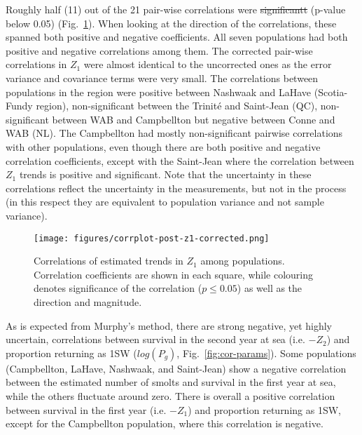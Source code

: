 \documentclass[12pt]{article}
\providecommand{\DIFaddtex}[1]{{\protect\color{blue}\uwave{#1}}} %
\providecommand{\DIFdeltex}[1]{{\protect\color{red}\sout{#1}}}                      %
\providecommand{\DIFaddbegin}{} %
\providecommand{\DIFaddend}{} %
\providecommand{\DIFdelbegin}{} %
\providecommand{\DIFdelend}{} %
\providecommand{\DIFadd}[1]{\texorpdfstring{\DIFaddtex{#1}}{#1}} %
\providecommand{\DIFdel}[1]{\texorpdfstring{\DIFdeltex{#1}}{}} %
\begin{document}
Roughly half (11) out of the 21 pair-wise correlations were \DIFdelbegin \DIFdel{significantt }\DIFdelend \DIFaddbegin \DIFadd{significant }\DIFaddend (p-value below 0.05)
(Fig.~\ref{fig:s1-corr}). When looking at the direction of the correlations,
these spanned both positive and negative coefficients. All seven populations had both
positive and negative correlations among them.
The corrected pair-wise correlations in $Z_1$ were almost identical to the
uncorrected ones as the error variance and covariance terms were very small.
The correlations between populations in the region were positive between Nashwaak and LaHave (Scotia-Fundy region), non-significant between the Trinit\'{e} and Saint-Jean (QC),
non-significant between WAB and Campbellton but negative between Conne and WAB (NL).
The Campbellton had mostly non-significant pairwise correlations with other populations, even though there are both positive and negative correlation coefficients, except with the Saint-Jean
where the correlation between $Z_1$ trends is positive and significant.
Note that the uncertainty in these correlations reflect the uncertainty in the
measurements, but not in the process (in this respect they are equivalent to
population variance and not sample variance).

\begin{figure}[htbp] \centering
    \texttt{[image: figures/corrplot-post-z1-corrected.png]} \caption{
        Correlations of estimated trends in $Z_1$ among populations.
        Correlation coefficients are shown in each square, while colouring
        denotes significance of the correlation ($p \leq 0.05$) as well as the direction and magnitude.}
\label{fig:s1-corr}
\end{figure}
As is expected from Murphy's method, there are strong negative, yet highly uncertain, correlations
between survival in the second year at sea (i.e. $-Z_2$) and proportion returning
as 1SW ($log(P_g)$, Fig.~\ref{fig:cor-params}). Some populations (Campbellton,
LaHave, Nashwaak, and Saint-Jean) show a negative correlation between the
estimated number of smolts and survival in the first year at sea, while the
others fluctuate around zero. There is overall a positive correlation between
survival in the first year (i.e. $-Z_1$) and proportion returning as 1SW,
except for the Campbellton population, where this correlation is negative.
\end{document}
